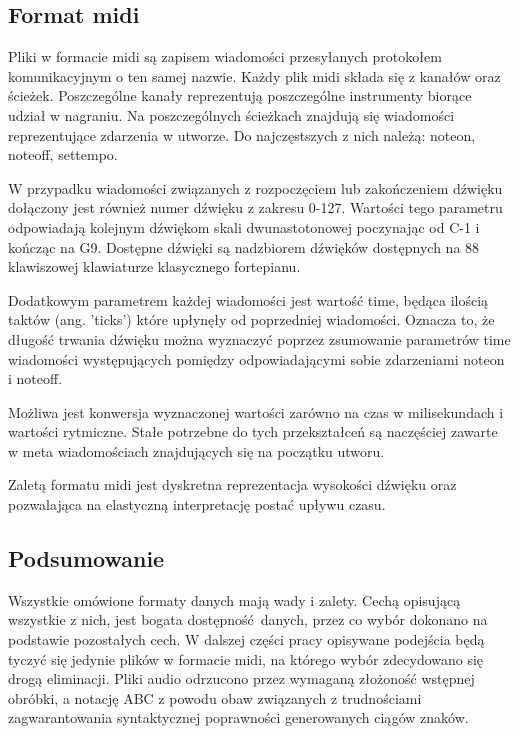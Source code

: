 {{        \subsection{Format midi}
        {
            Pliki w formacie midi są zapisem wiadomości przesyłanych protokołem komunikacyjnym o ten samej nazwie.
            Każdy plik midi składa się z kanałów oraz ścieżek. Poszczególne kanały reprezentują poszczególne instrumenty
            biorące udział w nagraniu. Na poszczególnych ścieżkach znajdują się wiadomości reprezentujące zdarzenia w utworze.
            Do najczęstszych z nich należą: note\textunderscore on, note\textunderscore off, set\textunderscore tempo.

            W przypadku wiadomości związanych z rozpoczęciem lub zakończeniem
            dźwięku dołączony jest również numer dźwięku z zakresu 0-127. 
            Wartości tego parametru odpowiadają kolejnym dźwiękom skali dwunastotonowej poczynając od C-1 i kończąc na G9.
            Dostępne dźwięki są nadzbiorem dźwięków dostępnych na 88 klawiszowej klawiaturze klasycznego fortepianu.

            Dodatkowym parametrem każdej wiadomości jest wartość time, będąca ilością taktów (ang. 'ticks') które upłynęły
            od poprzedniej wiadomości. Oznacza to, że długość trwania dźwięku można wyznaczyć poprzez zsumowanie parametrów time
            wiadomości występujących pomiędzy odpowiadającymi sobie zdarzeniami note\textunderscore on i note\textunderscore off.

            Możliwa jest konwersja wyznaczonej wartości zarówno na czas w milisekundach i wartości rytmiczne.
            Stałe potrzebne do tych przekształceń są naczęściej zawarte w meta wiadomościach znajdujących się na początku utworu.

            Zaletą formatu midi jest dyskretna reprezentacja wysokości dźwięku oraz pozwalająca na elastyczną 
            interpretację postać upływu czasu.
        }

        \subsection{Podsumowanie}
        {
            Wszystkie omówione formaty danych mają wady i zalety. Cechą opisującą wszystkie z nich, jest 
            bogata dostępność danych, przez co wybór dokonano na podstawie pozostałych cech.
            W dalszej części pracy opisywane podejścia będą tyczyć się jedynie plików w formacie midi, na którego 
            wybór zdecydowano się drogą eliminacji. Pliki audio odrzucono przez wymaganą złożoność wstępnej obróbki,
            a notację ABC z powodu obaw związanych z trudnościami zagwarantowania syntaktycznej poprawności 
            generowanych ciągów znaków.
        }
    }

}
